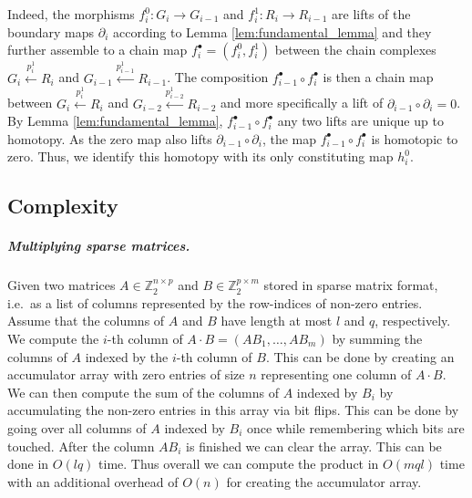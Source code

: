 \documentclass[a4paper,UKenglish,cleveref,nolineno,autoref]{socg-lipics-v2021}
\begin{document}
Indeed, the morphisms $f^0_i:G_i\rightarrow G_{i-1}$ and $f^1_i:R_i\rightarrow R_{i-1}$ are lifts of the boundary maps $\partial_i$ according to Lemma \ref{lem:fundamental_lemma} and they further assemble to a chain map $f^\bullet_i=(f^0_i,f^1_i)$ between the chain complexes $G_i\xleftarrow{p^1_i}R_i$ and $G_{i-1}\xleftarrow{p^1_{i-1}} R_{i-1}$. The composition $f^\bullet_{i-1}\circ f^\bullet_i$ is then a chain map between $G_i\xleftarrow{p^1_i}R_i$ and $G_{i-2}\xleftarrow{p^1_{i-2}}R_{i-2}$ and more specifically a lift of $\partial_{i-1}\circ\partial_i=0$. By Lemma \ref{lem:fundamental_lemma}, $f^\bullet_{i-1}\circ f^\bullet_i$ any two lifts are unique up to homotopy. As the zero map also lifts $\partial_{i-1}\circ \partial_i$, the map $f^\bullet_{i-1}\circ f^\bullet_i$ is homotopic to zero. Thus, we identify this homotopy with its only constituting map $h^0_i$. 

\subsection{Complexity}
\label{app:path_complexity}

\subparagraph{Multiplying sparse matrices.} Given two matrices $A\in\mathbb{Z}_2^{n\times p}$ and $B\in\mathbb{Z}_2^{p\times m}$ stored in sparse matrix format, i.e.\ as a list of columns represented by the row-indices of non-zero entries. Assume that the columns of $A$ and $B$ have length at most $l$ and $q$, respectively. We compute the $i$-th column of $A\cdot B=(AB_1,\ldots,AB_m)$ by summing the columns of $A$ indexed by the $i$-th column of $B$. This can be done by creating an accumulator array with zero entries of size $n$ representing one column of $A\cdot B$. We can then compute the sum of the columns of $A$ indexed by $B_i$ by accumulating the non-zero entries in this array via bit flips. This can be done by going over all columns of $A$ indexed by $B_i$ once while remembering which bits are touched. After the column $AB_i$ is finished we can clear the array. This can be done in $O(lq)$ time. Thus overall we can compute the product in $O(mql)$ time with an additional overhead of $O(n)$ for creating the accumulator array.
\end{document}
